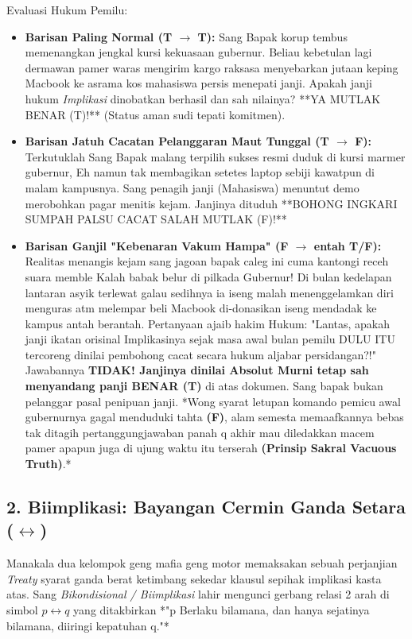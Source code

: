 Evaluasi Hukum Pemilu: 
\begin{itemize}
    \item \textbf{Barisan Paling Normal (T $\rightarrow$ T):} Sang Bapak korup tembus memenangkan jengkal kursi kekuasaan gubernur. Beliau kebetulan lagi dermawan pamer waras mengirim kargo raksasa menyebarkan jutaan keping Macbook ke asrama kos mahasiswa persis menepati janji. Apakah janji hukum \textit{Implikasi} dinobatkan berhasil dan sah nilainya? **YA MUTLAK BENAR (T)!** (Status aman sudi tepati komitmen).
    \item \textbf{Barisan Jatuh Cacatan Pelanggaran Maut Tunggal (T $\rightarrow$ F):} Terkutuklah Sang Bapak malang terpilih sukses resmi duduk di kursi marmer gubernur, Eh namun tak membagikan setetes laptop sebiji kawatpun di malam kampusnya. Sang penagih janji (Mahasiswa) menuntut demo merobohkan pagar menitis kejam. Janjinya dituduh **BOHONG INGKARI SUMPAH PALSU CACAT SALAH MUTLAK (F)!**
    \item \textbf{Barisan Ganjil "Kebenaran Vakum Hampa" (F $\rightarrow$ entah T/F):} Realitas menangis kejam sang jagoan bapak caleg ini cuma kantongi receh suara memble Kalah babak belur di pilkada Gubernur! Di bulan kedelapan lantaran asyik terlewat galau sedihnya ia iseng malah menenggelamkan diri menguras atm melempar beli Macbook di-donasikan iseng mendadak ke kampus antah berantah. Pertanyaan ajaib hakim Hukum: "Lantas, apakah janji ikatan orisinal Implikasinya sejak masa awal bulan pemilu DULU ITU tercoreng dinilai pembohong cacat secara hukum aljabar persidangan?!" Jawabannya \textbf{TIDAK! Janjinya dinilai Absolut Murni tetap sah menyandang panji BENAR (T)} di atas dokumen. Sang bapak bukan pelanggar pasal penipuan janji. *Wong syarat letupan komando pemicu awal gubernurnya gagal menduduki tahta \textbf{(F)}, alam semesta memaafkannya bebas tak ditagih pertanggungjawaban panah q akhir mau diledakkan macem pamer apapun juga di ujung waktu itu terserah \textbf{(Prinsip Sakral Vacuous Truth)}.*
\end{itemize}

\subsection{2. Biimplikasi: Bayangan Cermin Ganda Setara ($\leftrightarrow$)}

Manakala dua kelompok geng mafia geng motor memaksakan sebuah perjanjian \textit{Treaty} syarat ganda berat ketimbang sekedar klausul sepihak implikasi kasta atas. Sang \textit{Bikondisional / Biimplikasi} lahir mengunci gerbang relasi 2 arah di simbol $p \leftrightarrow q$ yang ditakbirkan *"p Berlaku bilamana, dan hanya sejatinya bilamana, diiringi kepatuhan q."*

